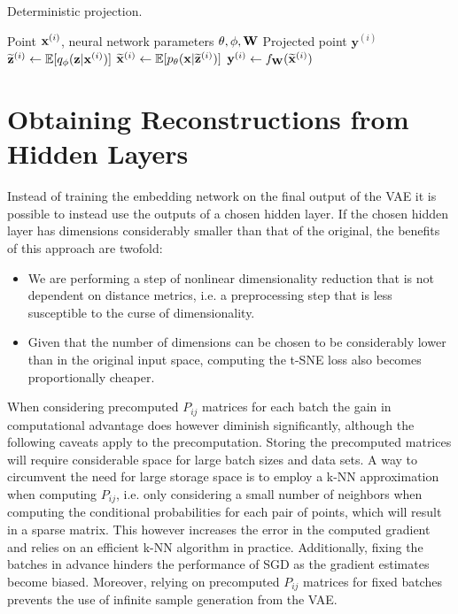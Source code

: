 \begin{algorithm}[H]
  \caption{Deterministic projection.}
  \label{alg:projection}
  \begin{algorithmic}[1]
    \Require Point $\mathbf{x}^{(i)}$, neural network parameters $\theta, \phi, \mathbf{W}$
    \Ensure Projected point $\mathbf{y}^{(i)}$
    \State $\widetilde{\mathbf{z}}^{(i)} \gets \mathbb{E}[q_{\phi}(\mathbf{z} \vert \mathbf{x}^{(i)})]$
    \State $\widetilde{\mathbf{x}}^{(i)} \gets \mathbb{E}[p_{\theta}(\mathbf{x} \vert \widetilde{\mathbf{z}}^{(i)})]$
    \State $\mathbf{y}^{(i)} \gets f_{\mathbf{W}}(\widetilde{\mathbf{x}}^{(i)})$
  \end{algorithmic}
\end{algorithm}

\section{Obtaining Reconstructions from Hidden Layers}
\label{section:sampling_from_hidden_layers}

Instead of training the embedding network on the final output of the VAE it is possible to instead use the outputs of a chosen hidden layer. If the chosen hidden layer has dimensions considerably smaller than that of the original, the benefits of this approach are twofold:

\begin{itemize}
\item We are performing a step of nonlinear dimensionality reduction that is not dependent on distance metrics, i.e. a preprocessing step that is less susceptible to the curse of dimensionality.
\item Given that the number of dimensions can be chosen to be considerably lower than in the original input space, computing the t-SNE loss also becomes proportionally cheaper.
\end{itemize}

When considering precomputed $P_{ij}$ matrices for each batch the gain in computational advantage does however diminish significantly, although the following caveats apply to the precomputation. Storing the precomputed matrices will require considerable space for large batch sizes and data sets. A way to circumvent the need for large storage space is to employ a k-NN approximation when computing $P_{ij}$, i.e. only considering a small number of neighbors when computing the conditional probabilities for each pair of points, which will result in a sparse matrix. This however increases the error in the computed gradient and relies on an efficient k-NN algorithm in practice. Additionally, fixing the batches in advance hinders the performance of SGD as the gradient estimates become biased. Moreover, relying on precomputed $P_{ij}$ matrices for fixed batches prevents the use of infinite sample generation from the VAE.

